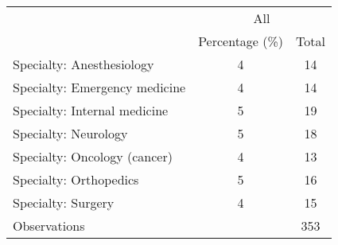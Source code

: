 \begin{tabular}{l*{1}{cc}}
\toprule
                &\multicolumn{2}{c}{All}\\
                &Percentage (\%)&    Total\\
\midrule
Specialty: Anesthesiology&        4&       14\\
Specialty: Emergency medicine&        4&       14\\
Specialty: Internal medicine&        5&       19\\
Specialty: Neurology&        5&       18\\
Specialty: Oncology (cancer)&        4&       13\\
Specialty: Orthopedics&        5&       16\\
Specialty: Surgery&        4&       15\\
\midrule Observations & & 353 \\ \bottomrule \end{tabular}
